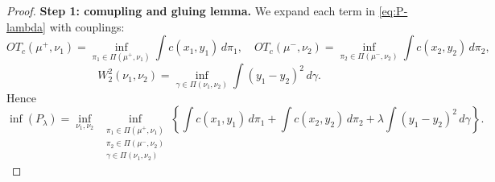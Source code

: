 \documentclass[11pt]{article}
\begin{document}
\begin{proof}


\textbf{Step 1: comupling and gluing lemma.}
We expand each term in \eqref{eq:P-lambda} with couplings:
\begin{equation*}
  OT_c(\mu^+,\nu_1)=\inf_{\pi_1\in\Pi(\mu^+,\nu_1)}\int c(x_1,y_1)\,d\pi_1,
\quad
OT_c(\mu^-,\nu_2)=\inf_{\pi_2\in\Pi(\mu^-,\nu_2)}\int c(x_2,y_2)\,d\pi_2,
\end{equation*}
\begin{equation*}
  W_2^2(\nu_1,\nu_2)=\inf_{\gamma\in\Pi(\nu_1,\nu_2)}\int (y_1-y_2)^2\,d\gamma.
\end{equation*}
Hence
\begin{equation*}
  \inf (P_\lambda) = 
  \inf_{\nu_1,\nu_2}\;
  \inf_{\substack{
    \pi_1\in\Pi(\mu^+,\nu_1)\\
    \pi_2\in\Pi(\mu^-,\nu_2)\\
    \gamma\in\Pi(\nu_1,\nu_2)
    }}\left\{
\int c(x_1,y_1)\,d\pi_1 + \int c(x_2,y_2)\,d\pi_2 + \lambda \int (y_1-y_2)^2\,d\gamma
\right\}.
\end{equation*}




\end{proof}
\end{document}
